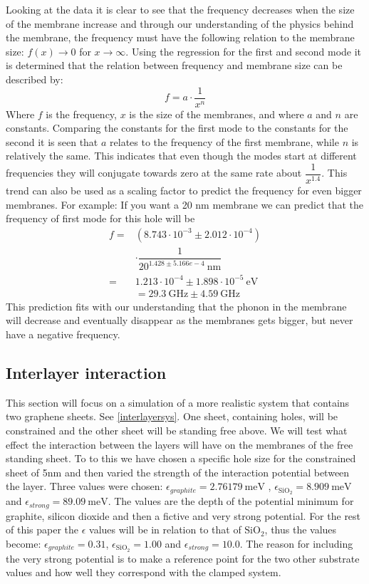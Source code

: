 Looking at the data it is clear to see that the frequency decreases when the size of the membrane increase and through our understanding of the physics behind the membrane, the frequency must have the following relation to the membrane size: $f(x)\rightarrow0$ for $x\rightarrow\infty$. Using the regression for the first and second mode it is determined that the relation between frequency and membrane size can be described by:\begin{equation}
    f=a\cdot\dfrac{1}{x^n}
\end{equation}Where $f$ is the frequency, $x$ is the size of the membranes, and where $a$ and $n$ are constants. Comparing the constants for the first mode to the constants for the second it is seen that $a$ relates to the frequency of the first membrane, while $n$ is relatively the same. This indicates that even though the modes start at different frequencies they will conjugate towards zero at the same rate about $\dfrac{1}{x^{1.4}}$. This trend can also be used as a scaling factor to predict the frequency for even bigger membranes. For example: If you want a 20 nm membrane we can predict that the frequency of first mode for this hole will be
    \begin{align}
     f = & \left(8.743\cdot10^{-3}\pm2.012\cdot10^{-4}\right)\nonumber\\
    & \cdot\dfrac{1}{20^{1.428\pm5.166e-4}\ \text{nm}}\nonumber\\
    = & 1.213\cdot10^{-4}\pm 1.898\cdot 10^{-5} \ \mathrm{eV}\nonumber\\
    & =29.3\ \text{GHz}\pm 4.59\ \text{GHz}
    \end{align}
This prediction fits with our understanding that the phonon in the membrane will decrease and eventually disappear as the membranes gets bigger, but never have a negative frequency.

\subsection{Interlayer interaction}\label{InterInter}
This section will focus on a simulation of a more realistic system that contains two graphene sheets. See \cref{interlayersys}. One sheet, containing holes, will be constrained and the other sheet will be standing free above. We will test what effect the interaction between the layers will have on the membranes of the free standing sheet. To to this we have chosen a specific hole size for the constrained sheet of 5nm and then varied the strength of the interaction potential between the layer. Three values were chosen: $\epsilon_{graphite}=\SI{2.76179}{\meV}$ \cite{Lebedeva2011}, $\epsilon_{\text{SiO}_{2}}=\SI{8.909}{\meV}$ \cite{Ong2010} and  $\epsilon_{strong}=\SI{89.09}{\meV}$. The values are the depth of the potential minimum for graphite, silicon dioxide and then a fictive and very strong potential. For the rest of this paper the $\epsilon$ values will be in relation to that of $\text{SiO}_{2}$, thus the values become: $\epsilon_{graphite}=0.31$, $\epsilon_{\text{SiO}_{2}}=1.00$ and  $\epsilon_{strong}=10.0$. The reason for including the very strong potential is to make a reference point for the two other substrate values and how well they correspond with the clamped system.
\onecolumngrid

